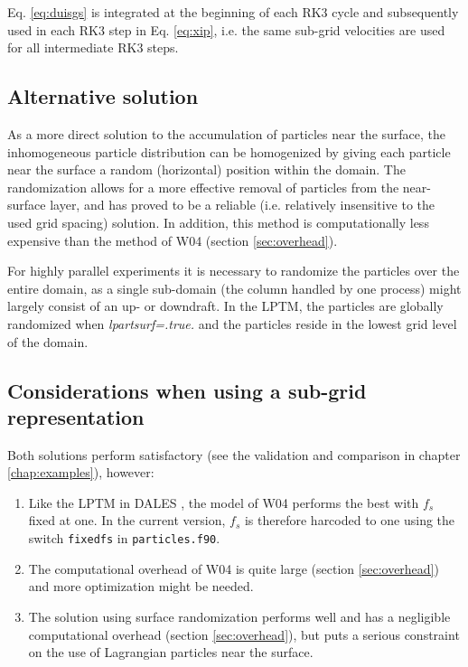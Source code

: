 \documentclass[twoside,a4paper]{report}
\begin{document}
Eq. \ref{eq:duisgs} is integrated at the beginning of each RK3 cycle and subsequently used in each RK3 step in Eq. \ref{eq:xip}, i.e. the same sub-grid velocities are used for all intermediate RK3 steps. 


\subsection{Alternative solution}

As a more direct solution to the accumulation of particles near the surface, the inhomogeneous particle distribution can be homogenized by giving each particle near the surface a random (horizontal) position within the domain. The randomization allows for a more effective removal of particles from the near-surface layer, and has proved to be a reliable (i.e. relatively insensitive to the used grid spacing) solution. In addition, this method is computationally less expensive than the method of W04 (section \ref{sec:overhead}).\newline

For highly parallel experiments it is necessary to randomize the particles over the entire domain, as a single sub-domain (the column handled by one process) might largely consist of an up- or downdraft. In the LPTM, the particles are globally randomized when \textit{lpartsurf=.true.} and the particles reside in the lowest grid level of the domain.

\subsection{Considerations when using a sub-grid representation}
\label{sec:rec_subgrid}

Both solutions perform satisfactory (see the validation and comparison in chapter \ref{chap:examples}), however:

\begin{enumerate}
 \item Like the LPTM in DALES \citep{heus2010}, the model of W04 performs the best with $f_s$ fixed at one. In the current version, $f_s$ is therefore harcoded to one using the switch \texttt{fixedfs} in \texttt{particles.f90}.
 \item The computational overhead of W04 is quite large (section \ref{sec:overhead}) and more optimization might be needed. 
 \item The solution using surface randomization performs well and has a negligible computational overhead (section \ref{sec:overhead}), but puts a serious constraint on the use of Lagrangian particles near the surface.   
\end{enumerate}
\end{document}
